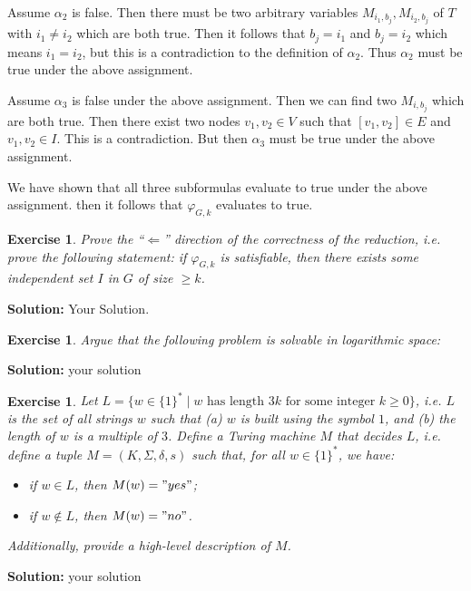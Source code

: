 \documentclass [10pt]{article}
\newtheorem{exercise}[theorem]{Exercise}
\renewcommand{\phi}{\varphi}
\begin{document}
Assume $\alpha_2$ is false. Then there must be two arbitrary variables $M_{i_1, b_j}, M_{i_2, b_j}$ of $T$ with $i_1 \neq i_2$ which are both true. Then it follows that $b_j = i_1$ and $b_j = i_2$ which means $i_1 = i_2$, but this is a contradiction to the definition of $\alpha_2$. Thus $\alpha_2$ must be true under the above assignment.

Assume $\alpha_3$ is false under the above assignment. Then we can find two $M_{i,b_j}$ which are both true. Then there exist two nodes $v_1, v_2 \in V$ such that $[v_1, v_2] \in E$ and $v_1, v_2 \in I$. This is a contradiction. But then $\alpha_3$ must be true under the above assignment.

We have shown that all three subformulas evaluate to true under the above assignment. then it follows that $\phi_{G, k}$ evaluates to true.

\begin{exercise}
  Prove the ``$\Leftarrow$'' direction of the correctness of the
  reduction, i.e.  prove the following statement: if $\phi_{G,k}$ is
  satisfiable, then there exists some independent set $I$ in $G$ of
  size $\geq k$.
\end{exercise}

\medskip

\textbf{Solution:} Your Solution.

\begin{exercise}
    Argue that the following problem is solvable in logarithmic space:

  \begin{center}
  \end{center}
    

\end{exercise}

\medskip

\textbf{Solution:} your solution

\begin{exercise}
    Let $L=\{w\in \{1\}^{*}\mid w \mbox{ has length }3k \mbox{ for some
      integer }k\geq 0\}$, i.e. $L$ is the set of all strings $w$ such that (a) $w$
    is built using the symbol $1$, and (b) the length of $w$ is a multiple of
    $3$. Define a Turing machine $M$ that decides $L$, i.e. define a tuple $M=
    (K,\Sigma, \delta, s)$ such that, for all $w\in \{1\}^{*}$, we have:
  \begin{itemize}
  \item if $w\in L$, then $M(w)="yes"$;
  \item if $w\not \in L$, then $M(w)="no"$.
  \end{itemize}
 Additionally, provide a high-level description of $M$.    
\end{exercise}

\medskip

\textbf{Solution:} your solution
\end{document}
